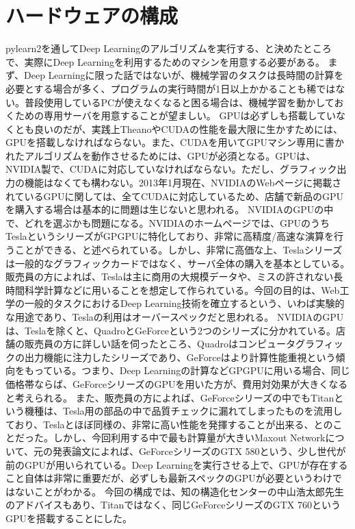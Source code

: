 \section{ハードウェアの構成}
pylearn2を通してDeep Learningのアルゴリズムを実行する、と決めたところで、実際にDeep Learningを利用するためのマシンを用意する必要がある。
まず、Deep Learningに限った話ではないが、機械学習のタスクは長時間の計算を必要とする場合が多く、プログラムの実行時間が1日以上かかることも稀ではない。普段使用しているPCが使えなくなると困る場合は、機械学習を動かしておくための専用サーバを用意することが望ましい。
GPUは必ずしも搭載していなくとも良いのだが、実践上TheanoやCUDAの性能を最大限に生かすためには、GPUを搭載しなければならない。また、CUDAを用いてGPUマシン専用に書かれたアルゴリズムを動作させるためには、GPUが必須となる。GPUは、NVIDIA製で、CUDAに対応していなければならない。ただし、グラフィック出力の機能はなくても構わない。2013年1月現在、NVIDIAのWebページに掲載されているGPUに関しては、全てCUDAに対応しているため、店舗で新品のGPUを購入する場合は基本的に問題は生じないと思われる。
NVIDIAのGPUの中で、どれを選ぶかも問題になる。NVIDIAのホームページでは、GPUのうちTeslaというシリーズがGPGPUに特化しており、非常に高精度/高速な演算を行うことができる、と述べられている。しかし、非常に高価な上、Teslaシリーズは一般的なグラフィックカードではなく、サーバ全体の購入を基本としている。販売員の方によれば、Teslaは主に商用の大規模データや、ミスの許されない長時間科学計算などに用いることを想定して作られている。今回の目的は、Web工学の一般的タスクにおけるDeep Learning技術を確立するという、いわば実験的な用途であり、Teslaの利用はオーバースペックだと思われる。
NVIDIAのGPUは、Teslaを除くと、QuadroとGeForceという2つのシリーズに分かれている。店舗の販売員の方に詳しい話を伺ったところ、Quadroはコンピュータグラフィックの出力機能に注力したシリーズであり、GeForceはより計算性能重視という傾向をもっている。つまり、Deep Learningの計算などGPGPUに用いる場合、同じ価格帯ならば、GeForceシリーズのGPUを用いた方が、費用対効果が大きくなると考えられる。
また、販売員の方によれば、GeForceシリーズの中でもTitanという機種は、Tesla用の部品の中で品質チェックに漏れてしまったものを流用しており、Teslaとほぼ同様の、非常に高い性能を発揮することが出来る、とのことだった。しかし、今回利用する中で最も計算量が大きいMaxout Networkについて、元の発表論文によれば、GeForceシリーズのGTX 580という、少し世代が前のGPUが用いられている。Deep Learningを実行させる上で、GPUが存在すること自体は非常に重要だが、必ずしも最新スペックのGPUが必要というわけではないことがわかる。
今回の構成では、知の構造化センターの中山浩太郎先生のアドバイスもあり、Titanではなく、同じGeForceシリーズのGTX 760というGPUを搭載することにした。
